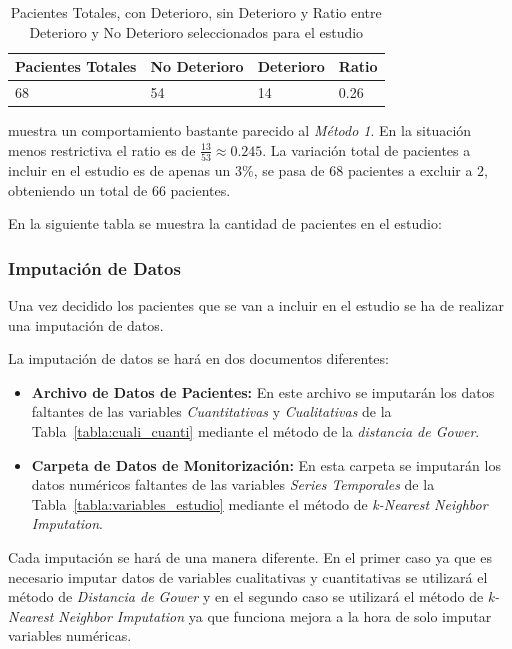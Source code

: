 \begin{table}[H]
    \centering
    \begin{tabular}{|m{2cm}|m{2.25cm}|m{2cm}|m{2cm}|}
    \hline
        Pacientes Totales & No Deterioro & Deterioro & Ratio \\ \hline
        68 & 54 & 14 & 0.26 \\ \hline
    \end{tabular}
    \caption{Pacientes Totales, con Deterioro, sin Deterioro y Ratio entre Deterioro y No Deterioro seleccionados para el estudio}
        \label{tabla:ratio-deterioro-P1}
\end{table}


muestra un comportamiento bastante parecido al \textit{Método 1}. En la situación menos restrictiva el ratio es de $ \frac{13}{53} \approx 0.245$. La variación total de pacientes a incluir en el estudio es de apenas un $3 \%$, se pasa de $68$ pacientes a excluir a $2$, obteniendo un total de $66$ pacientes.

En la siguiente tabla se muestra la cantidad de pacientes en el estudio:



\subsubsection{Imputación de Datos}\label{sec:imputacion-de-datos}

Una vez decidido los pacientes que se van a incluir en el estudio se ha de realizar una imputación de datos. 

La imputación de datos se hará en dos documentos diferentes:
\begin{itemize}
    \item \textbf{Archivo de Datos de Pacientes:} En este archivo se imputarán los datos faltantes de las variables \textit{Cuantitativas} y \textit{Cualitativas} de la Tabla~\ref{tabla:cuali_cuanti} mediante el método de la \textit{distancia de Gower}.
    \item \textbf{Carpeta de Datos de Monitorización:} En esta carpeta se imputarán los datos numéricos faltantes de las variables \textit{Series Temporales} de la Tabla~\ref{tabla:variables_estudio} mediante el método de \textit{k-Nearest Neighbor Imputation}.
\end{itemize}

Cada imputación se hará de una manera diferente. En el primer caso ya que es necesario imputar datos de variables cualitativas y cuantitativas se utilizará el método de \textit{Distancia de Gower} y en el segundo caso se utilizará el método de \textit{k-Nearest Neighbor Imputation} ya que funciona mejora a la hora de solo imputar variables numéricas. 

